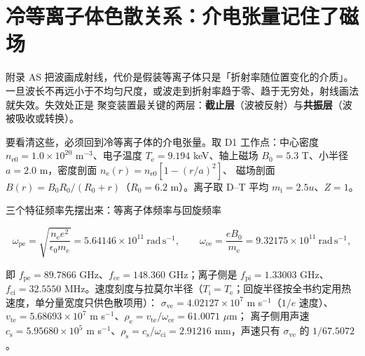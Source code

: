 
\section{冷等离子体色散关系：介电张量记住了磁场}
\label{sec:app-at-tensor}

附录 AS 把波画成射线，代价是假装等离子体只是「折射率随位置变化的介质」。一旦波长不再远小于不均匀尺度，或波走到折射率趋于零、趋于无穷处，射线画法就失效。失效处正是
聚变装置最关键的两层：\textbf{截止层}（波被反射）与\textbf{共振层}（波被吸收或转换）。

要看清这些，必须回到冷等离子体的介电张量。取 D1 工作点：中心密度
$n_\mathrm{e0}=1.0\times10^{20}$ m$^{-3}$、电子温度 $T_\mathrm{e}=9.194$ keV、轴上磁场
$B_0=5.3$ T、小半径 $a=2.0$ m，密度剖面 $n_\mathrm{e}(r)=n_\mathrm{e0}[1-(r/a)^2]$、
磁场剖面 $B(r)=B_0R_0/(R_0+r)$（$R_0=6.2$ m）。离子取 D--T 平均 $m_\mathrm{i}=2.5u$、$Z=1$。

三个特征频率先摆出来：等离子体频率与回旋频率

\begin{equation}
\omega_\mathrm{pe}=\sqrt{\frac{n_\mathrm{e}e^2}{\epsilon_0m_\mathrm{e}}}
=5.64146\times10^{11}\ \mathrm{rad\,s^{-1}},\qquad
\omega_\mathrm{ce}=\frac{eB_0}{m_\mathrm{e}}=9.32175\times10^{11}\ \mathrm{rad\,s^{-1}},
\label{eq:app-at-xy}
\end{equation}

即 $f_\mathrm{pe}=89.7866$ GHz、$f_\mathrm{ce}=148.360$ GHz；离子侧是 $f_\mathrm{pi}=1.33003$ GHz、
$f_\mathrm{ci}=32.5550$ MHz。速度刻度与拉莫尔半径（$T_\mathrm{i}=T_\mathrm{e}$；回旋半径按全书约定用热速度，单分量宽度只供色散项用）：
$\sigma_\mathrm{ve}=4.02127\times10^{7}$ m s$^{-1}$（$1/e$ 速度）、$v_\mathrm{te}=5.68693\times10^{7}$ m s$^{-1}$、$\rho_\mathrm{e}=v_\mathrm{te}/\omega_\mathrm{ce}=61.0071$ $\mu$m；
离子侧用声速 $c_\mathrm{s}=5.95680\times10^{5}$ m s$^{-1}$、$\rho_\mathrm{s}=c_\mathrm{s}/\omega_\mathrm{ci}=2.91216$ mm，声速只有 $\sigma_\mathrm{ve}$ 的 $1/67.5072$。

